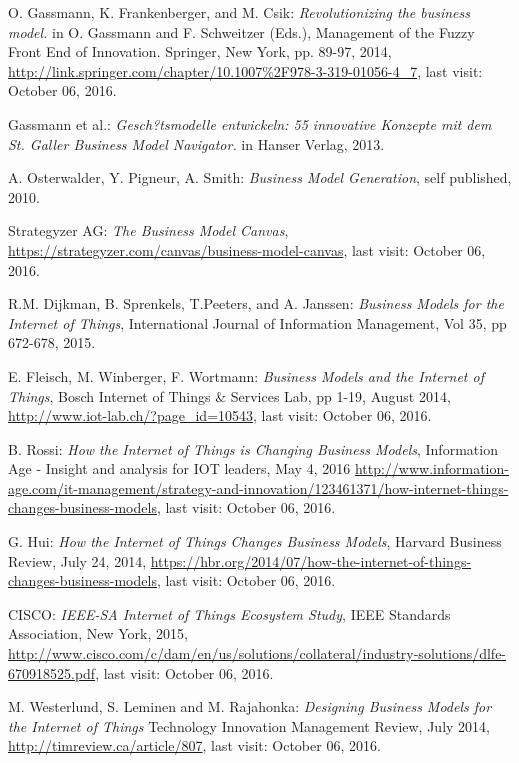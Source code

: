  \begin{thebibliography}{99}
	  O. Gassmann, K. Frankenberger, and M. Csik: \emph{Revolutionizing the business model.} in O. Gassmann and F. Schweitzer (Eds.), Management of the Fuzzy Front End of Innovation. Springer, New York, pp. 89-97, 2014, \url{http://link.springer.com/chapter/10.1007%2F978-3-319-01056-4_7}, last visit: October 06, 2016.

	  Gassmann et al.: \emph{Gesch?tsmodelle entwickeln: 55 innovative Konzepte mit dem St. Galler Business Model Navigator.} in Hanser Verlag, 2013.

	  A. Osterwalder, Y. Pigneur, A. Smith: \emph{Business Model Generation}, self published, 2010.

	  Strategyzer AG: \emph{The Business Model Canvas}, \url{https://strategyzer.com/canvas/business-model-canvas}, last visit: October 06, 2016.

	  R.M. Dijkman, B. Sprenkels, T.Peeters, and A. Janssen: \emph{Business Models for the Internet of Things}, International Journal of Information Management, Vol 35, pp 672-678, 2015.

	  E. Fleisch, M. Winberger, F. Wortmann: \emph{Business Models and the Internet of Things}, Bosch Internet of Things \& Services Lab, pp 1-19, August 2014, \url{http://www.iot-lab.ch/?page_id=10543}, last visit: October 06, 2016.

	  B. Rossi: \emph{How the Internet of Things is Changing Business Models}, Information Age - Insight and analysis for IOT leaders, May 4, 2016 \url{http://www.information-age.com/it-management/strategy-and-innovation/123461371/how-internet-things-changes-business-models}, last visit: October 06, 2016.

	  G. Hui: \emph{How the Internet of Things Changes Business Models}, Harvard Business Review, July 24, 2014, \url{https://hbr.org/2014/07/how-the-internet-of-things-changes-business-models}, last visit: October 06, 2016.

	  CISCO: \emph{IEEE-SA Internet of Things Ecosystem Study}, IEEE Standards Association, New York, 2015, \url{http://www.cisco.com/c/dam/en/us/solutions/collateral/industry-solutions/dlfe-670918525.pdf}, last visit: October 06, 2016.

	 M. Westerlund, S. Leminen and M. Rajahonka: \emph{Designing Business Models for the Internet of Things} Technology Innovation Management Review, July 2014, \url{http://timreview.ca/article/807}, last visit: October 06, 2016.


\end{thebibliography}
